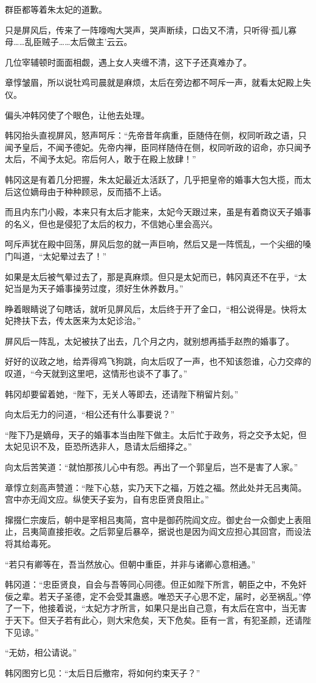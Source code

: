 群臣都等着朱太妃的道歉。

只是屏风后，传来了一阵嚎啕大哭声，哭声断续，口齿又不清，只听得‘孤儿寡母……乱臣贼子……太后做主’云云。

几位宰辅顿时面面相觑，遇上女人夹缠不清，这下子还真难办了。

章惇皱眉，所以说牡鸡司晨就是麻烦，太后在旁边都不呵斥一声，就看太妃殿上失仪。

偏头冲韩冈使了个眼色，让他去处理。

韩冈抬头直视屏风，怒声呵斥：“先帝昔年病重，臣随侍在侧，权同听政之语，只闻予皇后，不闻予德妃。先帝内禅，臣同样随侍在侧，权同听政的诏命，亦只闻予太后，不闻予太妃。帘后何人，敢于在殿上放肆！”

韩冈这是有着几分把握，朱太妃最近太活跃了，几乎把皇帝的婚事大包大揽，而太后这位嫡母由于种种顾忌，反而插不上话。

而且内东门小殿，本来只有太后才能来，太妃今天跟过来，虽是有着商议天子婚事的名义，但也是侵犯了太后的权力，不信她心里会高兴。

呵斥声犹在殿中回荡，屏风后忽的就一声巨响，然后又是一阵慌乱，一个尖细的嗓门叫道，“太妃晕过去了！”

如果是太后被气晕过去了，那是真麻烦。但只是太妃而已，韩冈真还不在乎，“太妃当是为天子婚事操劳过度，须好生休养数月。”

睁着眼睛说了句瞎话，就听见屏风后，太后终于开了金口，“相公说得是。快将太妃搀扶下去，传太医来为太妃诊治。”

屏风后一阵乱，太妃被扶了出去，几个月之内，就别想再插手赵煦的婚事了。

好好的议政之地，给弄得鸡飞狗跳，向太后叹了一声，也不知该怨谁，心力交瘁的叹道，“今天就到这里吧，这情形也谈不了事了。”

韩冈却要留着她，“陛下，无关人等即去，还请陛下稍留片刻。”

向太后无力的问道，“相公还有什么事要说？”

“陛下乃是嫡母，天子的婚事本当由陛下做主。太后忙于政务，将之交予太妃，但太妃见识不及，臣恐所选非人，恳请太后细择之。”

向太后苦笑道：“就怕那孩儿心中有怨。再出了一个郭皇后，岂不是害了人家。”

章惇立刻高声赞道：“陛下心慈，实乃天下之福，万姓之福。然此处并无吕夷简。宫中亦无阎文应。纵使天子妄为，自有忠臣贤良阻止。”

撺掇仁宗废后，朝中是宰相吕夷简，宫中是御药院阎文应。御史台一众御史上表阻止，吕夷简直接拒收。之后郭皇后暴卒，据说也是因为阎文应担心其回宫，而设法将其给毒死。

“若只有卿等在，吾当然放心。但朝中重臣，并非与诸卿心意相通。”

韩冈道：“忠臣贤良，自会与吾等同心同德。但正如陛下所言，朝臣之中，不免奸佞之辈。若天子圣德，定不会受其蛊惑。唯恐天子心思不定，届时，必至祸乱。”停了一下，他接着说，“太妃方才所言，如果只是出自己意，有太后在宫中，当无害于天下。但天子若有此心，则大宋危矣，天下危矣。臣有一言，有犯圣颜，还请陛下见谅。”

“无妨，相公请说。”

韩冈图穷匕见：“太后日后撤帘，将如何约束天子？”
